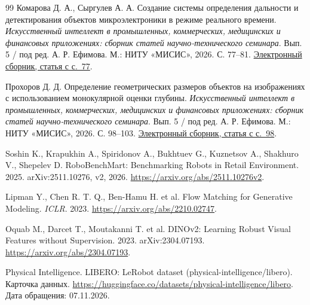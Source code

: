 \documentclass{misisarticle}
\begin{document}
\begin{thebibliography}{99}
Комарова Д. А., Сыргулев А. А. Создание системы определения дальности и детектирования объектов микроэлектроники в режиме реального времени. \textit{Искусственный интеллект в промышленных, коммерческих, медицинских и финансовых приложениях: сборник статей научно-технического семинара}. Вып. 5 / под ред. А. Р. Ефимова. М.: НИТУ «МИСИС», 2026. С. 77--81. \href{https://misis.ru/files/-/41f69c37b68def41ea566922c56b898e/kik_2025_2.pdf\#page=78}{Электронный сборник, статья с с.~77}.

Прохоров Д. Д. Определение геометрических размеров объектов на изображениях с использованием монокулярной оценки глубины. \textit{Искусственный интеллект в промышленных, коммерческих, медицинских и финансовых приложениях: сборник статей научно-технического семинара}. Вып. 5 / под ред. А. Р. Ефимова. М.: НИТУ «МИСИС», 2026. С. 98--103. \href{https://misis.ru/files/-/41f69c37b68def41ea566922c56b898e/kik_2025_2.pdf\#page=99}{Электронный сборник, статья с с.~98}.

Soshin K., Krapukhin A., Spiridonov A., Bukhtuev G., Kuznetsov A., Shakhuro V., Shepelev D. RoboBenchMart: Benchmarking Robots in Retail Environment. 2025. arXiv:2511.10276, v2, 2026. \url{https://arxiv.org/abs/2511.10276v2}.

Lipman Y., Chen R. T. Q., Ben-Hamu H. et al. Flow Matching for Generative Modeling. \textit{ICLR}. 2023. \url{https://arxiv.org/abs/2210.02747}.

Oquab M., Darcet T., Moutakanni T. et al. DINOv2: Learning Robust Visual Features without Supervision. 2023. arXiv:2304.07193. \url{https://arxiv.org/abs/2304.07193}.

Physical Intelligence. LIBERO: LeRobot dataset (physical-intelligence/libero). Карточка данных. \url{https://huggingface.co/datasets/physical-intelligence/libero}. Дата обращения: 07.11.2026.

\end{thebibliography}
\end{document}

